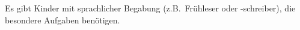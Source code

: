 Es gibt Kinder mit sprachlicher Begabung (z.B.\ Frühleser oder -schreiber), die besondere Aufgaben benötigen.